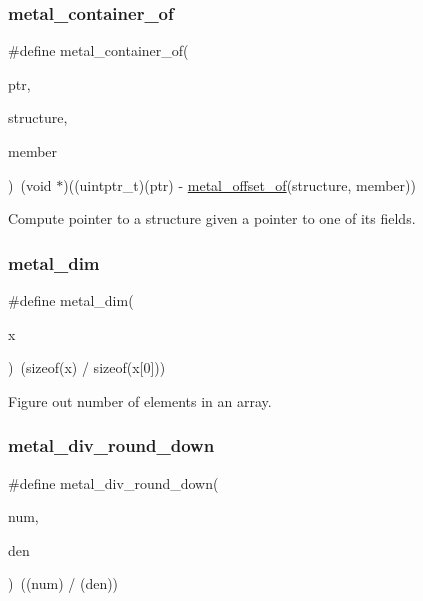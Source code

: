 \mbox{\label{group__utilities_ga641140abcd34001218982af331e559e1}} 
\subsubsection{\texorpdfstring{metal\+\_\+container\+\_\+of}{metal\_container\_of}}
{\footnotesize\ttfamily \#define metal\+\_\+container\+\_\+of(\begin{DoxyParamCaption}\item[{}]{ptr,  }\item[{}]{structure,  }\item[{}]{member }\end{DoxyParamCaption})~(void $\ast$)((uintptr\+\_\+t)(ptr) -\/ \hyperlink{group__utilities_gae60f3b54d150788936f856605ae97771}{metal\+\_\+offset\+\_\+of}(structure, member))}

Compute pointer to a structure given a pointer to one of its fields. \mbox{\label{group__utilities_ga28bf3f83d2efd1c6fb6b5bf63162ad32}} 
\subsubsection{\texorpdfstring{metal\+\_\+dim}{metal\_dim}}
{\footnotesize\ttfamily \#define metal\+\_\+dim(\begin{DoxyParamCaption}\item[{}]{x }\end{DoxyParamCaption})~(sizeof(x) / sizeof(x\mbox{[}0\mbox{]}))}

Figure out number of elements in an array. \mbox{\label{group__utilities_ga86077c41e1fb0d755b406d07213aecae}} 
\subsubsection{\texorpdfstring{metal\+\_\+div\+\_\+round\+\_\+down}{metal\_div\_round\_down}}
{\footnotesize\ttfamily \#define metal\+\_\+div\+\_\+round\+\_\+down(\begin{DoxyParamCaption}\item[{}]{num,  }\item[{}]{den }\end{DoxyParamCaption})~((num) / (den))}

